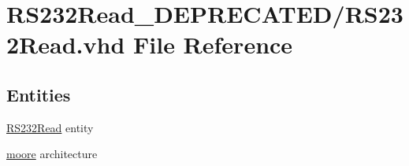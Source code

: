 \hypertarget{_d_e_p_r_e_c_a_t_e_d_2_r_s232_read_8vhd}{}\section{R\+S232\+Read\+\_\+\+D\+E\+P\+R\+E\+C\+A\+T\+E\+D/\+R\+S232\+Read.vhd File Reference}
\label{_d_e_p_r_e_c_a_t_e_d_2_r_s232_read_8vhd}
\subsection*{Entities}
\begin{DoxyCompactItemize}
\item 
\hyperlink{class_r_s232_read}{R\+S232\+Read} entity
\item 
\hyperlink{class_r_s232_read_1_1moore}{moore} architecture
\end{DoxyCompactItemize}
